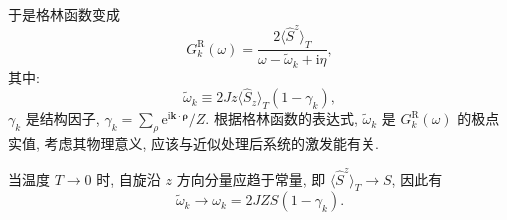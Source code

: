 于是格林函数变成
\begin{equation}
    G_k^{\mathrm{R}}(\omega)=\frac{2\langle \hat{S}^z \rangle_T}{\omega-\tilde{\omega}_k+\mathrm{i}\eta},
\end{equation}
其中:
\begin{equation}
    \tilde{\omega}_k\equiv 2Jz\langle \hat{S}_z \rangle_T(1-\gamma_k),
\end{equation}
$\gamma_k$ 是结构因子, $\gamma_k=\sum_\rho \mathrm{e}^{\mathrm{i}\boldsymbol{k}\cdot \boldsymbol\rho}/Z$. 根据格林函数的表达式, $\tilde{\omega}_k$ 是 $G_k^{\mathrm{R}}(\omega)$ 的极点实值, 考虑其物理意义, 应该与近似处理后系统的激发能有关.

当温度 $T\to 0$ 时, 自旋沿 $z$ 方向分量应趋于常量, 即 $\langle \hat{S}^z \rangle_T\to S$, 因此有 
\begin{equation}
    \tilde{\omega}_k\to \omega_k=2JZS(1-\gamma_k).
\end{equation}

